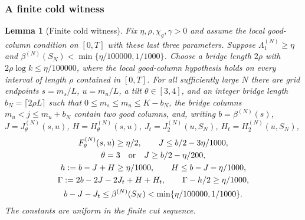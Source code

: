 \documentclass[11pt]{article}
\numberwithin{equation}{section}
\newtheorem{lemma}[theorem]{Lemma}
\theoremstyle{definition}
\theoremstyle{remark}
\newcommand{\1}{\mathbf 1}
\begin{document}
\subsubsection{A finite cold witness}

\begin{lemma}[Finite cold witness]%
\label{lem:cold-witness}
Fix $\eta,\rho,\chi_g,\gamma>0$ and assume the local good-column condition on $[0,T]$ with these last three parameters.
Suppose $\Lambda_1^{(N)}\ge\eta$ and
$\beta^{(N)}(S_N)<\min\{\eta/100000,1/1000\}$.
Choose a bridge length $2\rho$ with
$2\rho\log k\le\eta/100000$, where the local good-column hypothesis holds
on every interval of length $\rho$ contained in $[0,T]$. For all sufficiently large $N$ there
are grid endpoints $s=m_s/L$, $u=m_u/L$, a tilt $\theta\in[3,4]$, and an
integer bridge length $b_N=\lceil 2\rho L\rceil$ such that
$0\le m_s\le m_u\le K-b_N$, the bridge columns
$m_u<j\le m_u+b_N$ contain two good columns, and, writing
$b=\beta^{(N)}(s)$, $J=J_\theta^{(N)}(s,u)$,
$H=H_\theta^{(N)}(s,u)$, $J_t=J_2^{(N)}(u,S_N)$,
$H_t=H_2^{(N)}(u,S_N)$,
\begin{gather}
 F_\theta^{(N)}(s,u)\ge\eta/2,\qquad
 J\le b/2-3\eta/1000,\label{eq:repair-witness-upper}\\
 \theta=3\quad\hbox{or}\quad J\ge b/2-\eta/200,
 \label{eq:repair-witness-lower}\\
 h:=b-J+H\ge\eta/1000,\qquad H\le b-J-\eta/1000,
 \label{eq:repair-witness-geometry}\\
 \Gamma:=2b-2J-2J_t+H+H_t,\qquad
 \Gamma-h/2\ge\eta/1000,\label{eq:repair-witness-collision}\\
 b-J-J_t\le\beta^{(N)}(S_N)<\min\{\eta/100000,1/1000\}.
 \label{eq:repair-witness-mean}
\end{gather}
The constants are uniform in the finite cut sequence.
\end{lemma}
\end{document}
